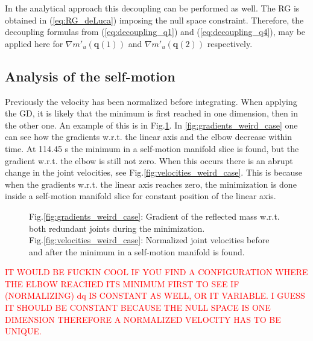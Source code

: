 In the analytical approach this decoupling can be performed as well. The RG is obtained in (\ref{eq:RG_deLuca}) imposing the null space constraint. Therefore, the decoupling formulas from (\ref{eq:decoupling_q1}) and (\ref{eq:decoupling_q4}), may be applied here for $\nabla m'_u(\mathbf{q}(1))$ and  $\nabla m'_u(\mathbf{q}(2))$ respectively.



\subsection{Analysis of the self-motion}





Previously the velocity has been normalized before integrating. When applying the GD, it is likely that the minimum is first reached in one dimension, then in the other one. An example of this is in Fig.\ref{fig:weird case}. In \ref{fig:gradients_weird_case} one can see how the gradients w.r.t. the linear axis %
and the elbow %
decrease within time. At 114.45 s the minimum in a self-motion manifold slice is found, but the gradient w.r.t. the elbow is still not zero. When this occurs there is an abrupt change in the joint velocities, see Fig.\ref{fig:velocities_weird_case}.
This is because when the gradients w.r.t. the linear axis %
reaches zero, the minimization is done inside a self-motion manifold slice for constant position of the linear axis.

\begin{figure}[!htb]
	\centering	
	 	 	 	
	\caption{Fig.\ref{fig:gradients_weird_case}: Gradient of the reflected mass w.r.t. both redundant joints during the minimization. \\ Fig.\ref{fig:velocities_weird_case}: Normalized joint velocities before and after the minimum in a self-motion manifold is found. }
	\label{fig:weird case}
\end{figure} 

\textcolor{red}{IT WOULD BE FUCKIN COOL IF YOU FIND A CONFIGURATION WHERE THE ELBOW REACHED ITS MINIMUM FIRST TO SEE IF (NORMALIZING) dq IS CONSTANT AS WELL, OR IT VARIABLE. I GUESS IT SHOULD BE CONSTANT BECAUSE THE NULL SPACE IS ONE DIMENSION THEREFORE A NORMALIZED VELOCITY HAS TO BE UNIQUE.}


